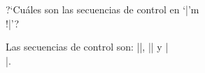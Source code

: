  


\bigskip

\enunciadoS ?`Cu\'ales son las secuencias de control en 
`|\I'm \\!|'?

\bigskip

\respuestaS Las secuencias de control son: |\I|, 
|\exercise| y |\\|\/.

\bye